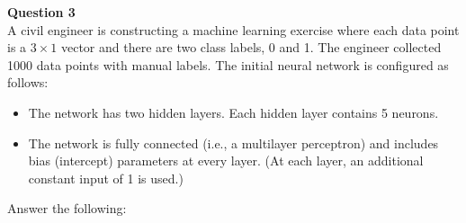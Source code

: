 \documentclass[12pt]{article}
\begin{document}
\vspace{1em}
\textbf{Question 3} \\

A civil engineer is constructing a machine learning exercise where each data point is a \(3\times 1\) vector and there are two class labels, 0 and 1. The engineer collected 1000 data points with manual labels. The initial neural network is configured as follows:
\begin{itemize}
    \item The network has two hidden layers. Each hidden layer contains 5 neurons.
    \item The network is fully connected (i.e., a multilayer perceptron) and includes bias (intercept) parameters at every layer. (At each layer, an additional constant input of 1 is used.)
\end{itemize}
Answer the following:
\end{document}
